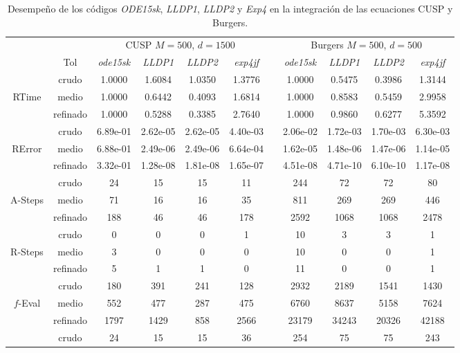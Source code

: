 \begin{table}
	\caption{Desempeño de los códigos \emph{ODE15sk}, \emph{LLDP1}, \emph{LLDP2} y \emph{Exp4} en la integración de las ecuaciones  CUSP y Burgers.}
	\label{tab:cuspburg}
	\begin{adjustbox}{width=0.95\columnwidth,center}
		\begin{tabular}{ccccccccccc}
			\hline
			&  & \multicolumn{4}{c}{CUSP $M=500$, $d=1500$} &  & \multicolumn{4}{c}{Burgers $M=500$, $d=500$} \\
			\cline{3-6}\cline{8-11} & Tol & \emph{ode15sk} & \emph{LLDP1} & \emph{LLDP2} & \emph{exp4jf} &  & \emph{ode15sk} & \emph{LLDP1} & \emph{LLDP2} & \emph{exp4jf} \\
			\hline
			& crudo & 1.0000 & 1.6084 & 1.0350 & 1.3776 &  & 1.0000 & 0.5475 & 0.3986 & 1.3144 \\
			RTime & medio & 1.0000 & 0.6442 & 0.4093 & 1.6814 &  & 1.0000 & 0.8583 & 0.5459 & 2.9958 \\
			& refinado & 1.0000 & 0.5288 & 0.3385 & 2.7640 &  & 1.0000 & 0.9860 & 0.6277 & 5.3592 \\
			\hline
			& crudo & 6.89e-01 & 2.62e-05 & 2.62e-05 & 4.40e-03 &  & 2.06e-02 & 1.72e-03 & 1.70e-03 & 6.30e-03 \\
			RError & medio & 6.88e-01 & 2.49e-06 & 2.49e-06 & 6.64e-04 &  & 1.62e-05 & 1.48e-06 & 1.47e-06 & 1.14e-05 \\
			& refinado & 3.32e-01 & 1.28e-08 & 1.81e-08 & 1.65e-07 &  & 4.51e-08 & 4.71e-10 & 6.10e-10 & 1.17e-08 \\
			\hline
			& crudo & 24 & 15 & 15 & 11 &  & 244 & 72 & 72 & 80 \\
			A-Steps & medio & 71 & 16 & 16 & 35 &  & 811 & 269 & 269 & 446 \\
			& refinado & 188 & 46 & 46 & 178 &  & 2592 & 1068 & 1068 & 2478 \\
			\hline
			& crudo & 0 & 0 & 0 & 1 &  & 10 & 3 & 3 & 1 \\
			R-Steps & medio & 3 & 0 & 0 & 0 &  & 10 & 0 & 0 & 1 \\
			& refinado & 5 & 1 & 1 & 0 &  & 11 & 0 & 0 & 1 \\
			\hline
			& crudo & 180 & 391 & 241 & 128 &  & 2932 & 2189 & 1541 & 1430 \\
			$f$-Eval & medio & 552 & 477 & 287 & 475 &  & 6760 & 8637 & 5158 & 7624 \\
			& refinado & 1797 & 1429 & 858 & 2566 &  & 23179 & 34243 & 20326 & 42188 \\
			\hline
			& crudo & 24 & 15 & 15 & 36 &  & 254 & 75 & 75 & 243 \\

\end{tabular}
\end{adjustbox}
\end{table}
